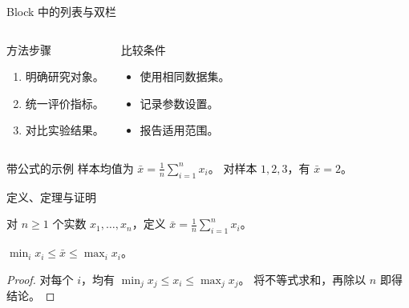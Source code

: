\begin{frame}{Block 中的列表与双栏}
  \begin{columns}[T,onlytextwidth]
    \begin{block}{方法步骤}
      \begin{enumerate}
        \item 明确研究对象。
        \item 统一评价指标。
        \item 对比实验结果。
      \end{enumerate}
    \end{block}

    \begin{alertblock}{比较条件}
      \begin{itemize}
        \item 使用相同数据集。
        \item 记录参数设置。
        \item 报告适用范围。
      \end{itemize}
    \end{alertblock}
  \end{columns}

  \begin{exampleblock}{带公式的示例}
    样本均值为 $\bar{x}=\frac{1}{n}\sum_{i=1}^{n}x_i$。
    对样本 $1,2,3$，有 $\bar{x}=2$。
  \end{exampleblock}
\end{frame}

\begin{frame}{定义、定理与证明}
  \begin{definition}[样本均值]
    对 $n\geq1$ 个实数 $x_1,\ldots,x_n$，定义
    $\bar{x}=\frac{1}{n}\sum_{i=1}^{n}x_i$。
  \end{definition}

  \begin{theorem}[均值界]
    $\min_i x_i\leq\bar{x}\leq\max_i x_i$。
  \end{theorem}

  \begin{proof}
    对每个 $i$，均有 $\min_j x_j\leq x_i\leq\max_j x_j$。
    将不等式求和，再除以 $n$ 即得结论。
  \end{proof}
\end{frame}

